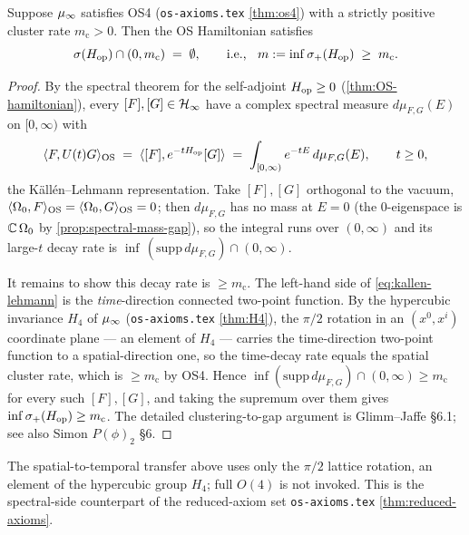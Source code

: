 \begin{theorem}
\label{thm:cluster-to-gap}
Suppose $\mu_\infty$ satisfies OS4 (\texttt{os-axioms.tex}
\cref{thm:os4}) with a strictly positive cluster rate $m_{\mathrm c} >
0$.  Then the OS Hamiltonian satisfies
\begin{equation*}
  \sigma(H_{\mathrm{op}}) \cap (0, m_{\mathrm c}) \;=\; \emptyset,
  \qquad \text{i.e., } \;\; m := \inf\sigma_+(H_{\mathrm{op}}) \;\ge\; m_{\mathrm c}.
\end{equation*}
\end{theorem}

\begin{proof}
By the spectral theorem for the self-adjoint $H_{\mathrm{op}} \ge 0$
(\cref{thm:OS-hamiltonian}), every $[F], [G] \in \mathcal{H}_\infty$ have a
complex spectral measure $d\mu_{F,G}(E)$ on $[0,\infty)$ with
\begin{equation}
  \label{eq:kallen-lehmann}
  \langle F, U(t) G \rangle_{\mathrm{OS}}
  \;=\; \langle [F], e^{-tH_{\mathrm{op}}} [G]\rangle
  \;=\; \int_{[0,\infty)} e^{-tE} \, d\mu_{F,G}(E),
  \qquad t \ge 0,
\end{equation}
the Källén--Lehmann representation.  Take $[F], [G]$ orthogonal to the
vacuum, $\langle \Omega_0, F \rangle_{\mathrm{OS}} = \langle \Omega_0, G \rangle_{\mathrm{OS}} = 0$; then
$d\mu_{F,G}$ has no mass at $E = 0$ (the $0$-eigenspace is
$\mathbb{C}\,\Omega_0$ by \cref{prop:spectral-mass-gap}), so the
integral runs over $(0,\infty)$ and its large-$t$ decay rate is
$\inf\,(\mathrm{supp}\, d\mu_{F,G}) \cap (0,\infty)$.

It remains to show this decay rate is $\ge m_{\mathrm c}$.  The
left-hand side of \eqref{eq:kallen-lehmann} is the \emph{time}-direction
connected two-point function.  By the hypercubic invariance $H_4$ of
$\mu_\infty$ (\texttt{os-axioms.tex} \cref{thm:H4}), the $\pi/2$ rotation
in an $(x^0, x^i)$ coordinate plane --- an element of $H_4$ --- carries
the time-direction two-point function to a spatial-direction one, so
the time-decay rate equals the spatial cluster rate, which is
$\ge m_{\mathrm c}$ by OS4.  Hence $\inf (\mathrm{supp}\,d\mu_{F,G})
\cap (0,\infty) \ge m_{\mathrm c}$ for every such $[F], [G]$, and
taking the supremum over them gives $\inf\sigma_+(H_{\mathrm{op}}) \ge
m_{\mathrm c}$.  The detailed clustering-to-gap argument is
Glimm--Jaffe \S6.1; see also Simon \emph{$P(\phi)_2$} \S6.
\end{proof}

\begin{remark}
\label{rem:H4-suffices}
The spatial-to-temporal transfer above uses only the $\pi/2$ lattice
rotation, an element of the hypercubic group $H_4$; full $O(4)$ is not
invoked.  This is the spectral-side counterpart of the reduced-axiom
set \texttt{os-axioms.tex} \cref{thm:reduced-axioms}.
\end{remark}

